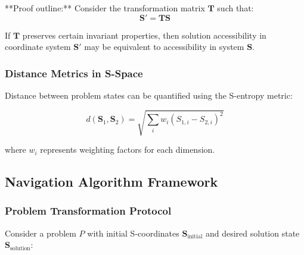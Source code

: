 \documentclass[12pt,a4paper]{article}
\begin{document}
**Proof outline:** Consider the transformation matrix $\mathbf{T}$ such that:
\begin{equation}
\mathbf{S}' = \mathbf{T} \mathbf{S}
\label{eq:coordinate_transformation}
\end{equation}

If $\mathbf{T}$ preserves certain invariant properties, then solution accessibility in coordinate system $\mathbf{S}'$ may be equivalent to accessibility in system $\mathbf{S}$.

\subsubsection{Distance Metrics in S-Space}

Distance between problem states can be quantified using the S-entropy metric:

\begin{equation}
d(\mathbf{S}_1, \mathbf{S}_2) = \sqrt{\sum_{i} w_i (S_{1,i} - S_{2,i})^2}
\label{eq:s_entropy_distance}
\end{equation}

where $w_i$ represents weighting factors for each dimension.

\subsection{Navigation Algorithm Framework}

\subsubsection{Problem Transformation Protocol}

Consider a problem $P$ with initial S-coordinates $\mathbf{S}_{\text{initial}}$ and desired solution state $\mathbf{S}_{\text{solution}}$:
\end{document}
